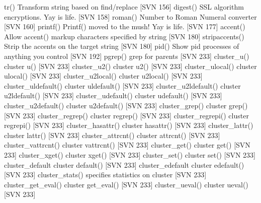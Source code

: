 \documentclass[letterpaper,10pt,english]{sphinxmanual}
\begin{document}
tr()            \sphinxhyphen{} Transform string based on find/replace {[}SVN 156{]}
digest()        \sphinxhyphen{} SSL algorithm encryptions.  Yay is life. {[}SVN 158{]}
roman()         \sphinxhyphen{} Number to Roman Numeral converter {[}SVN 160{]}
printf()        \sphinxhyphen{} Printf() moved to the mush!  Yay is life. {[}SVN 177{]}
accent()        \sphinxhyphen{} Allow accent() markup characters specified by string {[}SVN 180{]}
stripaccents()  \sphinxhyphen{} Strip the accents on the target string {[}SVN 180{]}
pid()           \sphinxhyphen{} Show pid processes of anything you control {[}SVN 192{]}
pgrep()         \sphinxhyphen{} grep for parents {[}SVN 233{]}
cluster\_u()             \sphinxhyphen{} cluster u() {[}SVN 233{]}
cluster\_u2()            \sphinxhyphen{} cluster u2() {[}SVN 233{]}
cluster\_ulocal()        \sphinxhyphen{} cluster ulocal() {[}SVN 233{]}
cluster\_u2local()       \sphinxhyphen{} cluster u2local() {[}SVN 233{]}
cluster\_uldefault()     \sphinxhyphen{} cluster uldefault() {[}SVN 233{]}
cluster\_u2ldefault()    \sphinxhyphen{} cluster u2ldefault() {[}SVN 233{]}
cluster\_udefault()      \sphinxhyphen{} cluster udefault() {[}SVN 233{]}
cluster\_u2default()     \sphinxhyphen{} cluster u2default() {[}SVN 233{]}
cluster\_grep()          \sphinxhyphen{} cluster grep() {[}SVN 233{]}
cluster\_regrep()        \sphinxhyphen{} cluster regrep() {[}SVN 233{]}
cluster\_regrepi()       \sphinxhyphen{} cluster regrepi() {[}SVN 233{]}
cluster\_hasattr()       \sphinxhyphen{} cluster hasattr() {[}SVN 233{]}
cluster\_lattr()         \sphinxhyphen{} cluster lattr() {[}SVN 233{]}
cluster\_attrcnt()       \sphinxhyphen{} cluster attrcnt() {[}SVN 233{]}
cluster\_vattrcnt()      \sphinxhyphen{} cluster vattrcnt() {[}SVN 233{]}
cluster\_get()           \sphinxhyphen{} cluster get() {[}SVN 233{]}
cluster\_xget()          \sphinxhyphen{} cluster xget() {[}SVN 233{]}
cluster\_set()           \sphinxhyphen{} cluster set() {[}SVN 233{]}
cluster\_default         \sphinxhyphen{} cluster default() {[}SVN 233{]}
cluster\_edefault        \sphinxhyphen{} cluster edefault() {[}SVN 233{]}
cluster\_stats()         \sphinxhyphen{} specifies statistics on cluster {[}SVN 233{]}
cluster\_get\_eval()      \sphinxhyphen{} cluster get\_eval() {[}SVN 233{]}
cluster\_ueval()         \sphinxhyphen{} cluster ueval() {[}SVN 233{]}
\end{document}
